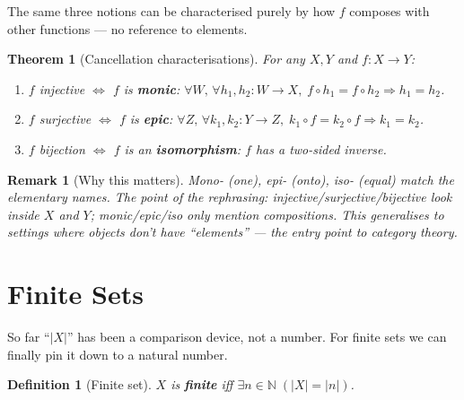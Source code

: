 \documentclass[11pt]{article}
\theoremstyle{defstyle}
\newtheorem{definition}{Definition}[section]
\theoremstyle{thmstyle}
\newtheorem{theorem}{Theorem}[section]
\theoremstyle{notstyle}
\newtheorem*{remark}{Remark}
\theoremstyle{cautionstyle}
\newcommand{\N}{\mathbb{N}}
\newcommand{\card}[1]{\lvert #1 \rvert}
\begin{document}
The same three notions can be characterised purely by how $f$ composes with
other functions --- no reference to elements.

\begin{thmbox}
\begin{theorem}[Cancellation characterisations]
For any $X, Y$ and $f : X \to Y$:
\begin{enumerate}[label=\textnormal{(\arabic*)}, leftmargin=2em, itemsep=4pt]
  \item $f$ injective $\iff$ $f$ is \textbf{monic}: \;
        $\forall W,\, \forall h_1, h_2 : W \to X,\;
         f \circ h_1 = f \circ h_2 \Rightarrow h_1 = h_2$.
  \item $f$ surjective $\iff$ $f$ is \textbf{epic}: \;
        $\forall Z,\, \forall k_1, k_2 : Y \to Z,\;
         k_1 \circ f = k_2 \circ f \Rightarrow k_1 = k_2$.
  \item $f$ bijection $\iff$ $f$ is an \textbf{isomorphism}: $f$ has a two-sided inverse.
\end{enumerate}
\end{theorem}
\end{thmbox}

\begin{notebox}
\begin{remark}[Why this matters]
Mono- (one), epi- (onto), iso- (equal) match the elementary names. The point
of the rephrasing: injective/surjective/bijective look \emph{inside} $X$ and
$Y$; monic/epic/iso only mention compositions. This generalises to settings
where objects don't have ``elements'' --- the entry point to category theory.
\end{remark}
\end{notebox}

\section{Finite Sets}

So far ``$\card{X}$'' has been a comparison device, not a number. For finite
sets we can finally pin it down to a natural number.

\begin{defbox}
\begin{definition}[Finite set]
$X$ is \textbf{finite} iff $\exists n \in \N \;(\card{X} = \card{n})$.
\end{definition}
\end{defbox}
\end{document}
